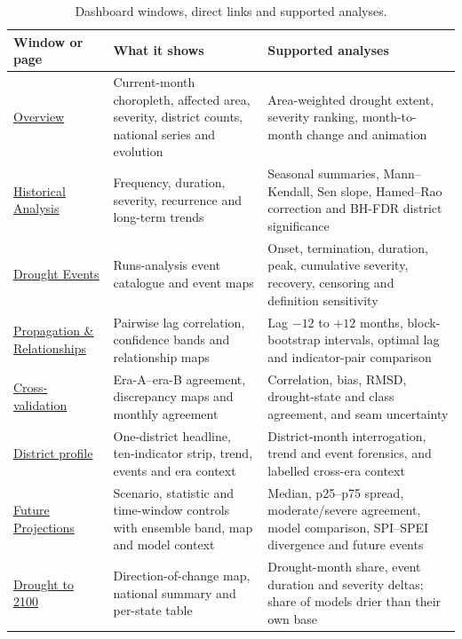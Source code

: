 \documentclass[10pt,a4paper]{article}
\begin{document}
\begin{table}[t]
\caption{Dashboard windows, direct links and supported analyses.}
\label{tab:windows}
\small
\begin{tabularx}{\textwidth}{@{}>{\RaggedRight\arraybackslash}p{}>{\RaggedRight\arraybackslash}p{}>{\RaggedRight\arraybackslash}X@{}}
\toprule
Window or page & What it shows & Supported analyses \\
\midrule
\href{https://drought.ankitdeshmukh.com/\#overview}{Overview} & Current-month choropleth, affected area, severity, district counts, national series and evolution & Area-weighted drought extent, severity ranking, month-to-month change and animation \\
\href{https://drought.ankitdeshmukh.com/\#historical}{Historical Analysis} & Frequency, duration, severity, recurrence and long-term trends & Seasonal summaries, Mann--Kendall, Sen slope, Hamed--Rao correction and BH-FDR district significance \\
\href{https://drought.ankitdeshmukh.com/\#events}{Drought Events} & Runs-analysis event catalogue and event maps & Onset, termination, duration, peak, cumulative severity, recovery, censoring and definition sensitivity \\
\href{https://drought.ankitdeshmukh.com/\#propagation}{Propagation \& Relationships} & Pairwise lag correlation, confidence bands and relationship maps & Lag $-12$ to $+12$ months, block-bootstrap intervals, optimal lag and indicator-pair comparison \\
\href{https://drought.ankitdeshmukh.com/\#crossval}{Cross-validation} & Era-A--era-B agreement, discrepancy maps and monthly agreement & Correlation, bias, RMSD, drought-state and class agreement, and seam uncertainty \\
\href{https://drought.ankitdeshmukh.com/\#/district/rajasthan-jodhpur}{District profile} & One-district headline, ten-indicator strip, trend, events and era context & District-month interrogation, trend and event forensics, and labelled cross-era context \\
\href{https://drought.ankitdeshmukh.com/\#projections}{Future Projections} & Scenario, statistic and time-window controls with ensemble band, map and model context & Median, p25--p75 spread, moderate/severe agreement, model comparison, SPI--SPEI divergence and future events \\
\href{https://drought.ankitdeshmukh.com/\#summary}{Drought to 2100} & Direction-of-change map, national summary and per-state table & Drought-month share, event duration and severity deltas; share of models drier than their own base \\

\end{tabularx}
\end{table}
\end{document}
